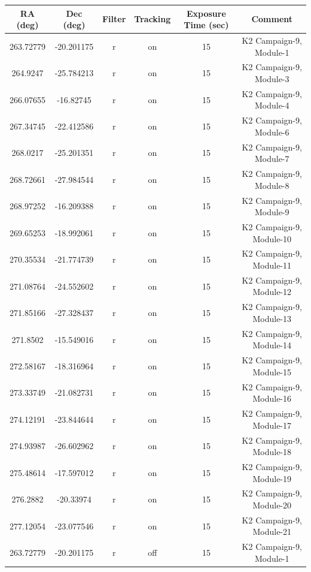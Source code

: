 \documentclass[11pt]{article}
\begin{document}
\begin{configuration}
\grating{-}
\order{-}
\crossdisperser{-}       
\slit{-}
\multislit{-}            
\wstart{-}
\wend{-}
\cable{-}
\corrector{-}            
\collimator{-}             
\adc{-}
\end{configuration}
\newpage
\begin{center}
\begin{longtable}{|c|c|c|c|c|c|}
\hline
RA (deg)& Dec (deg)& Filter & Tracking & Exposure Time (sec) & Comment\\
\hline
263.72779 & -20.201175 & r & on &15 & K2 Campaign-9, Module-1\\
264.9247 & -25.784213 & r & on &15 & K2 Campaign-9, Module-3\\
266.07655 & -16.82745 & r & on &15 & K2 Campaign-9, Module-4\\
267.34745 & -22.412586 & r & on &15 & K2 Campaign-9, Module-6\\
268.0217 & -25.201351 & r & on &15 & K2 Campaign-9, Module-7\\
268.72661 & -27.984544 & r & on &15 & K2 Campaign-9, Module-8\\
268.97252 & -16.209388 & r & on &15 & K2 Campaign-9, Module-9\\
269.65253 & -18.992061 & r & on &15 & K2 Campaign-9, Module-10\\
270.35534 & -21.774739 & r & on &15 & K2 Campaign-9, Module-11\\
271.08764 & -24.552602 & r & on &15 & K2 Campaign-9, Module-12\\
271.85166 & -27.328437 & r & on &15 & K2 Campaign-9, Module-13\\
271.8502 & -15.549016 & r & on &15 & K2 Campaign-9, Module-14\\
272.58167 & -18.316964 & r & on &15 & K2 Campaign-9, Module-15\\
273.33749 & -21.082731 & r & on &15 & K2 Campaign-9, Module-16\\
274.12191 & -23.844644 & r & on &15 & K2 Campaign-9, Module-17\\
274.93987 & -26.602962 & r & on &15 & K2 Campaign-9, Module-18\\
275.48614 & -17.597012 & r & on &15 & K2 Campaign-9, Module-19\\
276.2882 & -20.33974 & r & on &15 & K2 Campaign-9, Module-20\\
277.12054 & -23.077546 & r & on &15 & K2 Campaign-9, Module-21\\
263.72779 & -20.201175 & r & off &15 & K2 Campaign-9, Module-1\\

\end{longtable}
\end{center}
\end{document}
